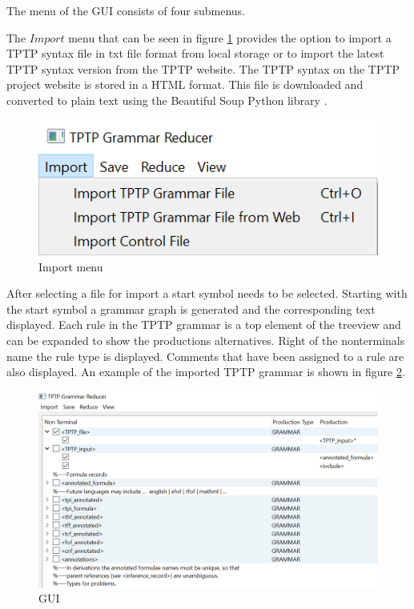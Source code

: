 The menu of the GUI consists of four submenus.

The $Import$ menu that can be seen in figure \ref{fig:import} provides the option to import a TPTP syntax file in txt file format from local storage or to import the latest TPTP syntax version from the TPTP website.
The TPTP syntax on the TPTP project website is stored in a HTML format.
This file is downloaded and converted to plain text using the Beautiful Soup Python library \cite{BeautifulSoup}.

\begin{figure}[H]
\centering
\includegraphics[width=1\textwidth]{images/import.png}
\caption{Import menu}
\label{fig:import}
\end{figure}

After selecting a file for import a start symbol needs to be selected.
Starting with the start symbol a grammar graph is generated and the corresponding text displayed.
Each rule in the TPTP grammar is a top element of the treeview and can be expanded to show the productions alternatives.
Right of the nonterminals name the rule type is displayed.
Comments that have been assigned to a rule are also displayed. An example of the imported TPTP grammar is shown in figure \ref{fig:gui}.

\begin{figure}[H]
\centering
\includegraphics[width=1\textwidth]{images/gui.png}
\caption{GUI}
\label{fig:gui}
\end{figure}

